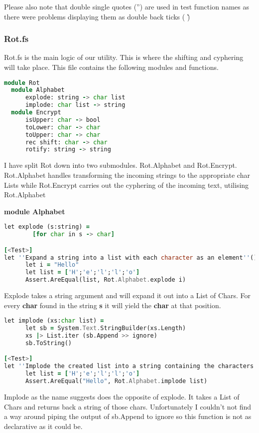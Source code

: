 Please also note that double single quotes ('') are used in test function names
as there were problems displaying them as double back ticks ( \` )

\subsubsection{Rot.fs}
Rot.fs is the main logic of our utility. This is where the shifting and
cyphering will take place. This file contains the following modules and functions.

\begin{lstlisting}[language=F]
  module Rot
  module Alphabet
      explode: string -> char list
      implode: char list -> string
  module Encrypt
      isUpper: char -> bool
      toLower: char -> char
      toUpper: char -> char
      rec shift: char -> char
      rotify: string -> string
\end{lstlisting}

I have split Rot down into two submodules. Rot.Alphabet and Rot.Encrypt. Rot.Alphabet
handles transforming the incoming strings to the appropriate char Lists while
Rot.Encrypt carries out the cyphering of the incoming text, utilising Rot.Alphabet

\bigskip

\textbf{module Alphabet}

\begin{lstlisting}[language=F]
let explode (s:string) =
        [for char in s -> char]

[<Test>]
let ''Expand a string into a list with each character as an element''() =
      let i = "Hello"
      let list = ['H';'e';'l';'l';'o']
      Assert.AreEqual(list, Rot.Alphabet.explode i)
\end{lstlisting}

Explode takes a string argument and will expand it out into a List of Chars.
For every \textbf{char} found in the string \textbf{s} it will yield the
\textbf{char} at that position.

\begin{lstlisting}[language=F]
let implode (xs:char list) =
      let sb = System.Text.StringBuilder(xs.Length)
      xs |> List.iter (sb.Append >> ignore)
      sb.ToString()

[<Test>]
let ''Implode the created list into a string containing the characters in the list''() =
      let list = ['H';'e';'l';'l';'o']
      Assert.AreEqual("Hello", Rot.Alphabet.implode list)
\end{lstlisting}
Implode as the name suggests does the opposite of explode. It takes a List of Chars
and returns back a string of those chars. Unfortunately I couldn't not find a way
around piping the output of sb.Append to ignore so this function is not as declarative as it could be.

